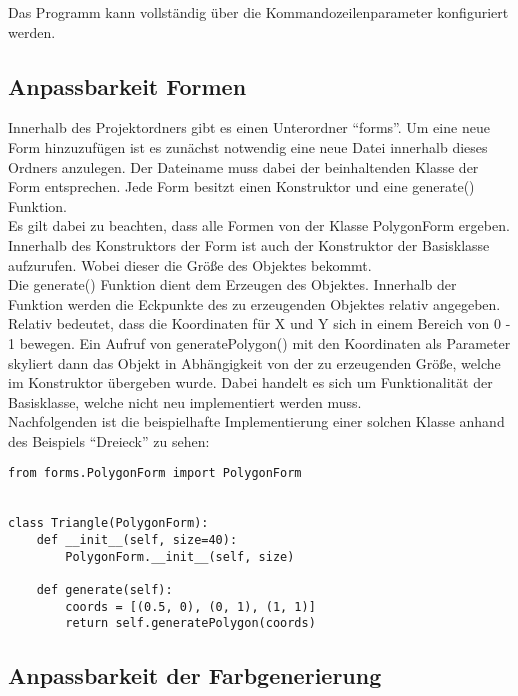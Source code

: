Das Programm kann vollständig über die Kommandozeilenparameter konfiguriert werden. 

\newpage

\subsection{Anpassbarkeit Formen}

Innerhalb des Projektordners gibt es einen Unterordner "`forms"'. Um eine neue Form hinzuzufügen ist es zunächst notwendig eine neue Datei innerhalb dieses Ordners anzulegen. Der Dateiname muss dabei der beinhaltenden Klasse der Form entsprechen. Jede Form besitzt einen Konstruktor und eine generate() Funktion. \\

Es gilt dabei zu beachten, dass alle Formen von der Klasse PolygonForm ergeben. Innerhalb des Konstruktors der Form ist auch der Konstruktor der Basisklasse aufzurufen. Wobei dieser die Größe des Objektes bekommt.\\

Die generate() Funktion dient dem Erzeugen des Objektes. Innerhalb der Funktion werden die Eckpunkte des zu erzeugenden Objektes relativ angegeben. Relativ bedeutet, dass die Koordinaten für X und Y sich in einem Bereich von 0 - 1 bewegen. Ein Aufruf von generatePolygon() mit den Koordinaten als Parameter skyliert dann das Objekt in Abhängigkeit von der zu erzeugenden Größe, welche im Konstruktor übergeben wurde. Dabei handelt es sich um Funktionalität der Basisklasse, welche nicht neu implementiert werden muss. \\

Nachfolgenden ist die beispielhafte Implementierung einer solchen Klasse anhand des Beispiels "`Dreieck"' zu sehen:\\

\begin{lstlisting}
from forms.PolygonForm import PolygonForm


class Triangle(PolygonForm):
    def __init__(self, size=40):
        PolygonForm.__init__(self, size)

    def generate(self):
        coords = [(0.5, 0), (0, 1), (1, 1)]
        return self.generatePolygon(coords)

\end{lstlisting}

\newpage

\subsection{Anpassbarkeit der Farbgenerierung}

\newpage